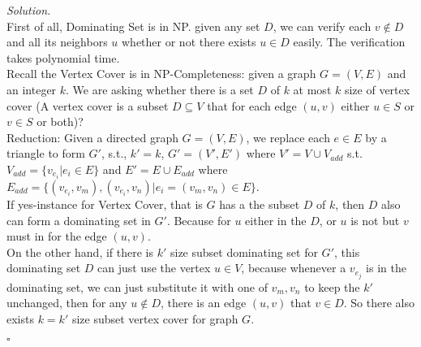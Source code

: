 \documentclass[11pt]{article}
\theoremstyle{definition}
\newenvironment{solution}{\noindent\emph{Solution.}}{\hfill$\square$}
\newcommand\tab[1][1cm]{\hspace*{#1}}
\begin{document}
\begin{solution}
\\
\tab First of all, Dominating Set is in NP. given any set $D$, we can verify each $v \notin D$ and all its neighbors $u$ whether or not there exists $u \in D$ easily. The verification takes polynomial time.\\
\tab Recall the Vertex Cover is in NP-Completeness: given a graph $G = (V,E)$ and an integer $k$. We are asking whether there is a set $D$ of $k$ at most $k$ size of vertex cover (A vertex cover is a  subset $D \subseteq V$ that for each edge $(u,v)$ either $u \in S$ or $v \in S$ or both)? \\
\tab Reduction: Given a directed graph $G=(V,E)$, we replace each $e \in E$ by a triangle to form $G'$, s.t., $k' = k$, $G' = (V',E')$ where $V' = V \cup V_{add}$ s.t. $V_{add} =\{ v_{e_i} \vert e_i \in E \}$ and $E' = E \cup E_{add}$ where $E_{add} = \{ (v_{e_i}, v_m), (v_{e_i}, v_n) \vert e_i = (v_m, v_n) \in E \}$.\\
\tab If yes-instance for Vertex Cover, that is $G$ has a the subset $D$ of $k$, then $D$ also can form a dominating set in $G'$. Because for $u$ either in the $D$, or $u$ is not but $v$ must in for the edge $(u,v)$.\\
\tab On the other hand, if there is $k'$ size subset dominating set for $G'$, this dominating set $D$ can just use the vertex $u \in V$, because whenever a $v_{e_j}$ is in the dominating set, we can just substitute it with one of ${v_m, v_n}$ to keep the $k'$ unchanged,  then for any $u \notin D$, there is an edge $(u, v)$ that $v \in D$. So there also exists $k = k'$ size subset vertex cover for graph $G$.





\end{solution}
\end{document}
